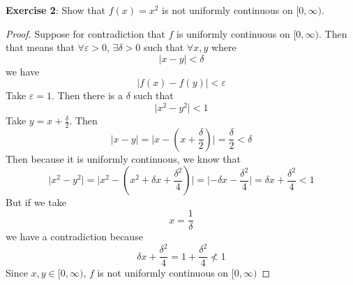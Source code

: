 \documentclass{article}
\begin{document}
\textbf{Exercise 2}: Show that $f(x) = x^{2}$ is not uniformly continuous on $[0, \infty)$.
    \begin{proof}
        Suppose for contradiction that $f$ is uniformly continuous on $[0, \infty)$. Then that means that $\forall \varepsilon> 0$, $\exists \delta > 0$ such that $\forall x, y$ where
            \begin{equation*}
                \lvert x - y \rvert < \delta
            \end{equation*}
        we have
            \begin{equation*}
                \lvert f(x) - f(y) \rvert < \varepsilon
            \end{equation*}
        Take $\varepsilon = 1$. Then there is a $\delta$ such that
            \begin{equation*}
                \lvert x^{2} - y^{2} \rvert < 1 
            \end{equation*}
        Take $y = x + \frac{\delta}{ 2}$. Then
            \begin{equation*}
                \lvert x - y \rvert = \lvert x - (x + \dfrac{\delta}{ 2}) \rvert = \dfrac{\delta}{ 2} < \delta
            \end{equation*}
        Then because it is uniformly continuous, we know that
            \begin{equation*}
                \lvert x^{2} - y^{2} \rvert = \lvert x^{2} - (x^{2} + \delta x + \dfrac{ \delta^{2}}{4}) \rvert  = \lvert -\delta x - \dfrac{\delta^{2}}{4} \rvert = \delta x + \dfrac{\delta^{2}}{4} < 1
            \end{equation*}
        But if we take
            \begin{equation*}
                x = \dfrac{1}{\delta}
            \end{equation*}
        we have a contradiction because
            \begin{equation*}
                \delta x + \dfrac{\delta^{2}}{4} = 1 + \dfrac{\delta^{2}}{4}  \not< 1
            \end{equation*}
        Since $x, y \in [0, \infty)$, $f$ is not uniformly continuous on $[0, \infty)$
    \end{proof}
\end{document}
